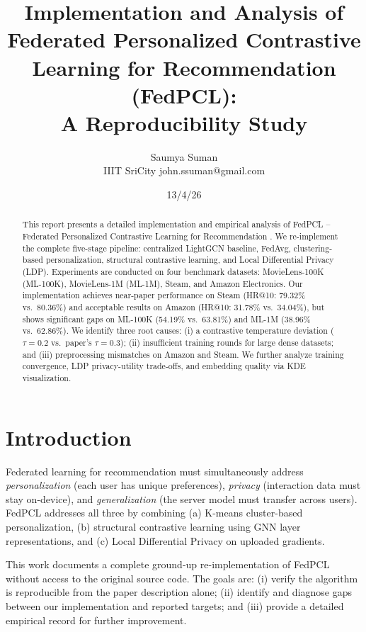 \documentclass[10pt,twocolumn]{article}
\title{\textbf{Implementation and Analysis of Federated Personalized
Contrastive Learning for Recommendation (FedPCL):}\\
\large A Reproducibility Study}
\author{Saumya Suman\\
\small IIIT SriCity \quad john.ssuman@gmail.com}
\date{13/4/26}
\begin{document}
\maketitle
\thispagestyle{fancy}

\begin{abstract}
This report presents a detailed implementation and empirical analysis of
FedPCL -- Federated Personalized Contrastive Learning for Recommendation
\cite{fedpcl2023}. We re-implement the complete five-stage pipeline:
centralized LightGCN baseline, FedAvg, clustering-based personalization,
structural contrastive learning, and Local Differential Privacy (LDP).
Experiments are conducted on four benchmark datasets: MovieLens-100K
(ML-100K), MovieLens-1M (ML-1M), Steam, and Amazon Electronics. Our
implementation achieves near-paper performance on Steam (HR@10:
79.32\% vs.\ 80.36\%) and acceptable results on Amazon (HR@10: 31.78\%
vs.\ 34.04\%), but shows significant gaps on ML-100K (54.19\%
vs.\ 63.81\%) and ML-1M (38.96\% vs.\ 62.86\%). We identify three root
causes: (i) a contrastive temperature deviation ($\tau{=}0.2$
vs.\ paper's $\tau{=}0.3$); (ii) insufficient training rounds for large
dense datasets; and (iii) preprocessing mismatches on Amazon and Steam.
We further analyze training convergence, LDP privacy-utility trade-offs,
and embedding quality via KDE visualization.
\end{abstract}

\section{Introduction}
\label{sec:intro}

Federated learning for recommendation must simultaneously address
\emph{personalization} (each user has unique preferences),
\emph{privacy} (interaction data must stay on-device), and
\emph{generalization} (the server model must transfer across users).
FedPCL \cite{fedpcl2023} addresses all three by combining (a) K-means
cluster-based personalization, (b) structural contrastive learning using
GNN layer representations, and (c) Local Differential Privacy on uploaded
gradients.

This work documents a complete ground-up re-implementation of FedPCL
without access to the original source code. The goals are:
(i) verify the algorithm is reproducible from the paper description alone;
(ii) identify and diagnose gaps between our implementation and reported
targets; and
(iii) provide a detailed empirical record for further improvement.
\end{document}
